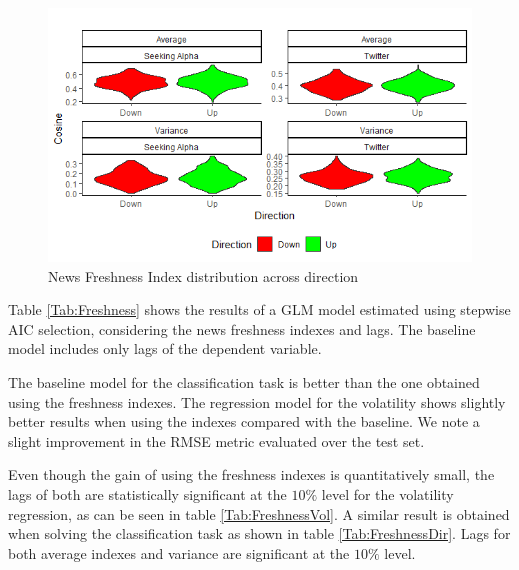 \documentclass[a4paper, 12pt]{report}
\begin{document}
    \begin{figure}[H]
    \centering
    \includegraphics[width=15cm]{graphs/500DistrFresh.png}
    \caption{News Freshness Index distribution across direction}
    \label{Fig:DistrFresh}
    \end{figure}
    
    Table \ref{Tab:Freshness} shows the results of a GLM model estimated using stepwise AIC selection, considering the news freshness indexes and lags.  The baseline model includes only lags of the dependent variable.
    
    The baseline model for the classification task is better than the one obtained using the freshness indexes. The regression model for the volatility shows slightly better results when using the indexes compared with the baseline. We note a slight improvement in the RMSE metric evaluated over the test set. 
    
    Even though the gain of using the freshness indexes is quantitatively small, the lags of both are statistically significant at the $10\%$ level for the volatility regression, as can be seen in table \ref{Tab:FreshnessVol}. A similar result is obtained when solving the classification task as shown in table \ref{Tab:FreshnessDir}. Lags for both average indexes and variance are significant at the $10\%$ level. 
    
\end{document}
